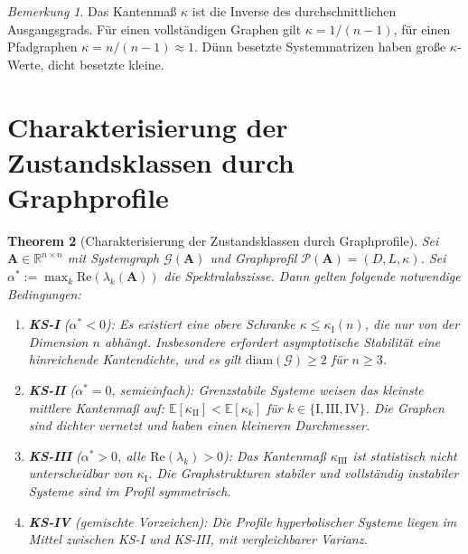 ﻿\documentclass[12pt, a4paper, titlepage]{report}
\newtheorem{theorem}{Theorem}[section]
\theoremstyle{definition}
\theoremstyle{remark}
\newtheorem{remark}[theorem]{Bemerkung}
\newcommand{\R}{\mathbb{R}}
\newcommand{\vA}{\bm{A}}
\newcommand{\re}{\mathrm{Re}}
\begin{document}
\begin{remark}
Das Kantenmaß $\kappa$ ist die Inverse des durchschnittlichen Ausgangsgrads.
Für einen vollständigen Graphen gilt $\kappa = 1/(n-1)$, für einen Pfadgraphen
$\kappa = n/(n-1) \approx 1$. Dünn besetzte Systemmatrizen haben große $\kappa$-Werte,
dicht besetzte kleine.
\end{remark}

\section{Charakterisierung der Zustandsklassen durch Graphprofile}

\begin{theorem}[Charakterisierung der Zustandsklassen durch Graphprofile]
\label{thm:ks_graphprofil}
Sei $\vA \in \R^{n \times n}$ mit Systemgraph $\mathcal{G}(\vA)$ und Graphprofil
$\mathcal{P}(\vA) = (D, L, \kappa)$. Sei $\alpha^* := \max_k \re(\lambda_k(\vA))$
die Spektralabszisse. Dann gelten folgende notwendige Bedingungen:
\begin{enumerate}[label=(\roman*)]
  \item \textbf{KS-I} ($\alpha^* < 0$): Es existiert eine obere Schranke
    $\kappa \leq \kappa_{\mathrm{I}}(n)$, die nur von der Dimension $n$ abhängt.
    Insbesondere erfordert asymptotische Stabilität eine hinreichende Kantendichte,
    und es gilt $\mathrm{diam}(\mathcal{G}) \geq 2$ für $n \geq 3$.
  \item \textbf{KS-II} ($\alpha^* = 0$, semieinfach): Grenzstabile Systeme weisen
    das kleinste mittlere Kantenmaß auf: $\mathbb{E}[\kappa_{\mathrm{II}}] <
    \mathbb{E}[\kappa_k]$ für $k \in \{\mathrm{I}, \mathrm{III}, \mathrm{IV}\}$.
    Die Graphen sind dichter vernetzt und haben einen kleineren Durchmesser.
  \item \textbf{KS-III} ($\alpha^* > 0$, alle $\re(\lambda_k) > 0$): Das Kantenmaß
    $\kappa_{\mathrm{III}}$ ist statistisch nicht unterscheidbar von $\kappa_{\mathrm{I}}$.
    Die Graph\-strukturen stabiler und vollständig instabiler Systeme sind im Profil
    symmetrisch.
  \item \textbf{KS-IV} (gemischte Vorzeichen): Die Profile hyperbolischer Systeme
    liegen im Mittel zwischen KS-I und KS-III, mit vergleichbarer Varianz.
\end{enumerate}
\end{theorem}
\end{document}
